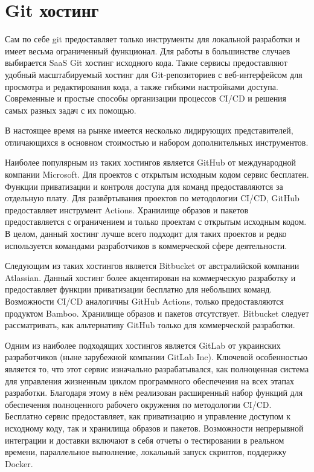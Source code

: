 \section{Git хостинг}

Сам по себе git предоставляет только инструменты для локальной разработки и имеет весьма ограниченный функционал.
Для работы в большинстве случаев выбирается SaaS Git хостинг исходного кода.
Такие сервисы предоставляют удобный масштабируемый хостинг для Git-репозиториев с веб-интерфейсом для просмотра и редактирования кода,
а также гибкими настройками доступа.
Современные и простые способы организации процессов CI/CD и решения самых разных задач с их помощью.

В настоящее время на рынке имеется несколько лидирующих представителей, отличающихся в основном стоимостью и набором дополнительных инструментов\cite{web:git-reps:rating}.

Наиболее популярным из таких хостингов является GitHub от международной компании Microsoft.
Для проектов с открытым исходным кодом сервис бесплатен.
Функции приватизации и контроля доступа для команд предоставляются за отдельную плату.
Для развёртывания проектов по методологии CI/CD, GitHub предоставляет инструмент Actions.
Хранилище образов и пакетов предоставляется с ограничением и только проектам с открытым исходным кодом.
В целом, данный хостинг лучше всего подходит для таких проектов и редко используется командами разработчиков в коммерческой сфере деятельности.

Следующим из таких хостингов является Bitbucket\cite{web:bitbucket} от австралийской компании Atlassian.
Данный хостинг более акцентирован на коммерческую разработку и предоставляет функции приватизации бесплатно для небольших команд.
Возможности CI/CD аналогичны GitHub Actions, только предоставляются продуктом Bamboo.
Хранилище образов и пакетов отсутствует.
Bitbucket следует рассматривать, как альтернативу GitHub только для коммерческой разработки\cite{web:github:docs}.

Одним из наиболее подходящих хостингов является GitLab от украинских разработчиков (ныне зарубежной компании GitLab Inc).
Ключевой особенностью является то, что этот сервис изначально разрабатывался,
как полноценная система для управления жизненным циклом программного обеспечения на всех этапах разработки.
Благодаря этому в нём реализован расширенный набор функций для обеспечения полноценного рабочего окружения по методологии CI/CD.
Бесплатно сервис предоставляет, как приватизацию и управление доступом к исходному коду, так и хранилища образов и пакетов.
Возможности непрерывной интеграции и доставки включают в себя отчеты о тестировании в реальном времени, параллельное выполнение, локальный запуск скриптов, поддержку Docker\cite{web:gitlab}.


